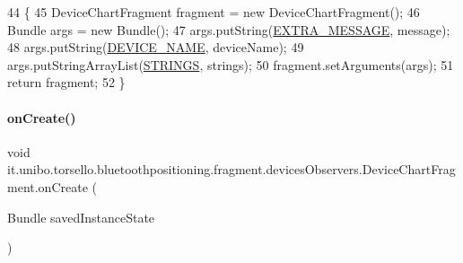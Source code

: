 \begin{DoxyCode}
44                                                                              \{
45         DeviceChartFragment fragment = \textcolor{keyword}{new} DeviceChartFragment();
46         Bundle args = \textcolor{keyword}{new} Bundle();
47         args.putString(\hyperlink{classit_1_1unibo_1_1torsello_1_1bluetoothpositioning_1_1fragment_1_1devicesObservers_1_1DeviceChartFragment_a07b2f252088c2cf0af46ea39ae83bc09_a07b2f252088c2cf0af46ea39ae83bc09}{EXTRA\_MESSAGE}, message);
48         args.putString(\hyperlink{classit_1_1unibo_1_1torsello_1_1bluetoothpositioning_1_1fragment_1_1devicesObservers_1_1DeviceChartFragment_a5f778eb494a70b25d52ea96e85342011_a5f778eb494a70b25d52ea96e85342011}{DEVICE\_NAME}, deviceName);
49         args.putStringArrayList(\hyperlink{classit_1_1unibo_1_1torsello_1_1bluetoothpositioning_1_1fragment_1_1devicesObservers_1_1DeviceChartFragment_a343835bbfb305e22881397c1b9249b00_a343835bbfb305e22881397c1b9249b00}{STRINGS}, strings);
50         fragment.setArguments(args);
51         \textcolor{keywordflow}{return} fragment;
52     \}
\end{DoxyCode}
\hypertarget{classit_1_1unibo_1_1torsello_1_1bluetoothpositioning_1_1fragment_1_1devicesObservers_1_1DeviceChartFragment_a2941a5d389e0ab2c21cb96a61ba72dca_a2941a5d389e0ab2c21cb96a61ba72dca}{}\label{classit_1_1unibo_1_1torsello_1_1bluetoothpositioning_1_1fragment_1_1devicesObservers_1_1DeviceChartFragment_a2941a5d389e0ab2c21cb96a61ba72dca_a2941a5d389e0ab2c21cb96a61ba72dca} 
\paragraph{\texorpdfstring{on\+Create()}{onCreate()}}
{\footnotesize\ttfamily void it.\+unibo.\+torsello.\+bluetoothpositioning.\+fragment.\+devices\+Observers.\+Device\+Chart\+Fragment.\+on\+Create (\begin{DoxyParamCaption}\item[{Bundle}]{saved\+Instance\+State }\end{DoxyParamCaption})}


